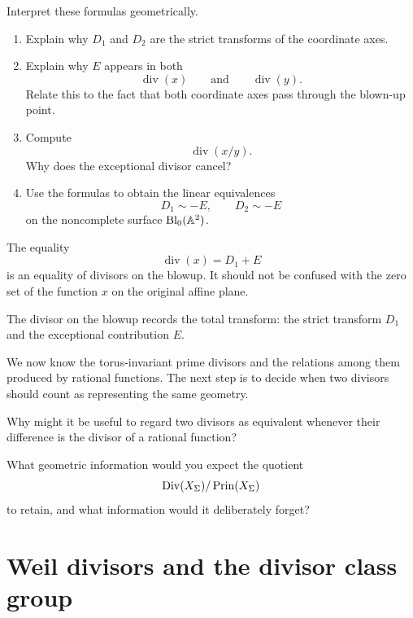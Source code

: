 \begin{surfacelaboratory}
Interpret these formulas geometrically.

\begin{enumerate}[label=(\alph*),wide=0pt]
\item Explain why \(D_1\) and \(D_2\) are the strict transforms of the
coordinate axes.

\item Explain why \(E\) appears in both
\[
\operatorname{div}(x)
\qquad\text{and}\qquad
\operatorname{div}(y).
\]
Relate this to the fact that both coordinate axes pass through the
blown-up point.

\item Compute
\[
\operatorname{div}(x/y).
\]
Why does the exceptional divisor cancel?

\item Use the formulas to obtain the linear equivalences
\[
D_1\sim -E,
\qquad
D_2\sim -E
\]
on the noncomplete surface \(\Blp{\AAA^2}{0}\).
\end{enumerate}
\end{surfacelaboratory}

\begin{warningbox}
The equality
\[
\operatorname{div}(x)=D_1+E
\]
is an equality of divisors on the blowup. It should not be confused
with the zero set of the function \(x\) on the original affine plane.

The divisor on the blowup records the total transform: the strict
transform \(D_1\) and the exceptional contribution \(E\).
\end{warningbox}

We now know the torus-invariant prime divisors and the relations among
them produced by rational functions. The next step is to decide when
two divisors should count as representing the same geometry.

\begin{guidingquestion}
Why might it be useful to regard two divisors as equivalent whenever
their difference is the divisor of a rational function?

What geometric information would you expect the quotient
\[
\Div(X_\Sigma)/
\Prin(X_\Sigma)
\]
to retain, and what information would it deliberately forget?
\end{guidingquestion}


\section{Weil divisors and the divisor class group}
\label{sec:weil-divisors-class-group}

